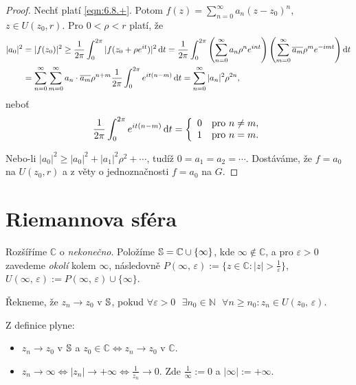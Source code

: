 \begin{proof}
Nechť platí \cref{eqn:6.8.+}. Potom $f(z)=\sum\limits_{n=0}^\infty a_n(z-z_0)^{n}$, $z\in U(z_0,r)$. Pro $0<\rho<r$ platí, že 
\begin{equation}
    \begin{aligned}
    |a_0|^2 &=
    |f(z_0)|^2 \geq 
    \frac{1}{2 \pi} \int_{0}^{2 \pi} |f(z_0+\rho e^{it})|^2 \mathop{}\!\mathrm{d} t =
    \frac{1}{2\pi} \int_{0}^{2 \pi} \left(\sum\limits_{n=0}^\infty a_n \rho^n e^{int}\right)\left(\sum\limits_{m=0}^\infty \overline{a_m} \rho^m e^{-imt}\right) \mathop{}\!\mathrm{d} t  \\
    & = \sum\limits_{n=0}^\infty \sum\limits_{m=0}^\infty a_n\cdot \overline{a_m} \rho^{n+m} \frac{1}{2 \pi} \int_{0}^{2 \pi}  e^{it(n-m)} \mathop{}\!\mathrm{d} t=\sum\limits_{n=0}^\infty |a_n|^2\rho^{2n},
    \end{aligned}
\end{equation}
 neboť
 $$\frac{1}{2 \pi} \int_{0}^{2 \pi}  e^{it(n-m)} \mathop{}\!\mathrm{d} t = \left\{ \begin{array}{ll} 0 & \mbox{pro } n \neq m, \\ 1 & \mbox{pro } n = m. \end{array} \right.$$ 

Nebo-li $|a_0|^2\geq|a_0|^2+|a_1|^2\rho^2+\cdots$, tudíž $0=a_1=a_2=\cdots$. Dostáváme, že $f=a_0$ na $U(z_0,r)$ a z věty o jednoznačnosti $f=a_0$ na $G$.
\end{proof}

\section{\texorpdfstring{Riemannova sféra}{Riemannova sféra}}
Rozšíříme $\mathbb{C}$ o \emph{nekonečno}.
Položíme $\operatorname{\mathbb{S}}=\mathbb{C}\cup\{\infty\}$, kde $\infty\notin\mathbb{C}$, a pro $\varepsilon>0$ zavedeme \emph{okolí} kolem $\infty$, následovně $P(\infty,\,\varepsilon):=\{z\in\mathbb{C}: |z|>\frac{1}{\varepsilon}\}$,
$U(\infty,\,\varepsilon):=P(\infty,\,\varepsilon)\cup \{\infty\}$.

\begin{definition}
Řekneme, že $z_n\rightarrow z_0$ v $\operatorname{\mathbb{S}}$, pokud $\forall\varepsilon>0\textbf{ }  \exists n_0\in\mathbb{N}\textbf{ }\forall n\geq n_0:z_n\in U(z_0,\,\varepsilon)$.
\end{definition}

\begin{note} Z definice plyne:
\begin{itemize}
    \item $z_n\rightarrow z_0$ v $\operatorname{\mathbb{S}}$ a $z_0\in\mathbb{C}\Leftrightarrow z_n\rightarrow z_0$ v $\mathbb{C}$.
    \item $z_n\rightarrow\infty\Leftrightarrow|z_n|\rightarrow+\infty\Leftrightarrow\frac{1}{z_n}\rightarrow 0$. Zde $\frac{1}{\infty}:=0$ a $|\infty|:=+\infty$.
\end{itemize}
\end{note}

